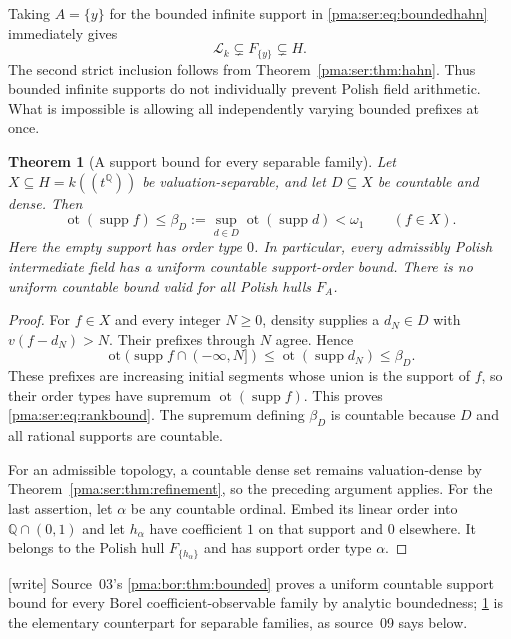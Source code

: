 \documentclass[11pt]{article}
\numberwithin{equation}{section}
\newtheorem{theorem}{Theorem}[section]
\theoremstyle{definition}
\theoremstyle{remark}
\newcommand{\Q}{\mathbb Q}
\newcommand{\supp}{\operatorname{supp}}
\newcommand{\writetag}{\textup{\textsf{\small[write]}}}
\newcommand{\Lk}{\mathcal L_k}
\begin{document}
Taking $A=\{y\}$ for the bounded infinite support in
\eqref{pma:ser:eq:boundedhahn} immediately gives
\[
 \Lk\subsetneq F_{\{y\}}\subsetneq H.
\]
The second strict inclusion follows from Theorem~\ref{pma:ser:thm:hahn}.
Thus bounded infinite supports do not individually prevent Polish field
arithmetic. What is impossible is allowing all independently varying bounded
prefixes at once.

\begin{theorem}[A support bound for every separable family]
\label{pma:ser:thm:rankbound}
Let $X\subseteq H=k((t^\Q))$ be valuation-separable, and let $D\subseteq X$
be countable and dense. Then
\begin{equation}\label{pma:ser:eq:rankbound}
 \operatorname{ot}(\supp f)
 \leq\beta_D:=\sup_{d\in D}\operatorname{ot}(\supp d)<\omega_1
 \qquad(f\in X).
\end{equation}
Here the empty support has order type $0$. In particular, every admissibly
Polish intermediate field has a uniform countable support-order bound.
There is no uniform countable bound valid for all Polish hulls $F_A$.
\end{theorem}
\begin{proof}
For $f\in X$ and every integer $N\geq0$, density supplies a $d_N\in D$
with $v(f-d_N)>N$. Their prefixes through $N$ agree. Hence
\[
 \operatorname{ot}(\supp f\cap(-\infty,N])
 \leq\operatorname{ot}(\supp d_N)\leq\beta_D.
\]
These prefixes are increasing initial segments whose union is the support
of $f$, so their order types have supremum
$\operatorname{ot}(\supp f)$. This proves \eqref{pma:ser:eq:rankbound}.
The supremum defining $\beta_D$ is countable because $D$ and all rational
supports are countable.

For an admissible topology, a countable dense set remains valuation-dense
by Theorem~\ref{pma:ser:thm:refinement}, so the preceding argument applies.
For the last assertion, let $\alpha$ be any countable ordinal. Embed its
linear order into $\Q\cap(0,1)$ and let $h_\alpha$ have coefficient $1$
on that support and $0$ elsewhere. It belongs to the Polish hull
$F_{\{h_\alpha\}}$ and has support order type $\alpha$.
\end{proof}

\noindent\writetag{} Source~03's \cref{pma:bor:thm:bounded} proves a uniform
countable support bound for every Borel coefficient-observable family by
analytic boundedness; \cref{pma:ser:thm:rankbound} is the elementary
counterpart for separable families, as source~09 says below.
\end{document}
